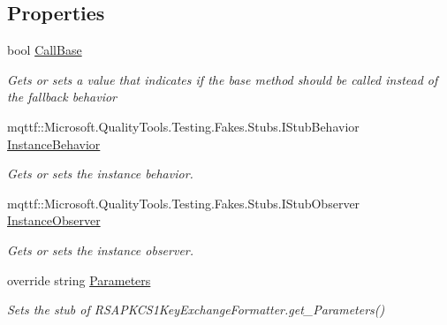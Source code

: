 \subsection*{Properties}
\begin{DoxyCompactItemize}
\item 
bool \hyperlink{class_system_1_1_security_1_1_cryptography_1_1_fakes_1_1_stub_r_s_a_p_k_c_s1_key_exchange_formatter_a1330ac59aff0bd5f97177640cbb83a26}{Call\-Base}
\begin{DoxyCompactList}\small\item\em Gets or sets a value that indicates if the base method should be called instead of the fallback behavior\end{DoxyCompactList}\item 
mqttf\-::\-Microsoft.\-Quality\-Tools.\-Testing.\-Fakes.\-Stubs.\-I\-Stub\-Behavior \hyperlink{class_system_1_1_security_1_1_cryptography_1_1_fakes_1_1_stub_r_s_a_p_k_c_s1_key_exchange_formatter_ad95b55be19491f5a748d0d7d90506676}{Instance\-Behavior}
\begin{DoxyCompactList}\small\item\em Gets or sets the instance behavior.\end{DoxyCompactList}\item 
mqttf\-::\-Microsoft.\-Quality\-Tools.\-Testing.\-Fakes.\-Stubs.\-I\-Stub\-Observer \hyperlink{class_system_1_1_security_1_1_cryptography_1_1_fakes_1_1_stub_r_s_a_p_k_c_s1_key_exchange_formatter_ab29a8f80bba014b471134eeec544081e}{Instance\-Observer}
\begin{DoxyCompactList}\small\item\em Gets or sets the instance observer.\end{DoxyCompactList}\item 
override string \hyperlink{class_system_1_1_security_1_1_cryptography_1_1_fakes_1_1_stub_r_s_a_p_k_c_s1_key_exchange_formatter_ad13dbd63166ee597e4a4dfa8f2cd449b}{Parameters}
\begin{DoxyCompactList}\small\item\em Sets the stub of R\-S\-A\-P\-K\-C\-S1\-Key\-Exchange\-Formatter.\-get\-\_\-\-Parameters()\end{DoxyCompactList}\end{DoxyCompactItemize}


